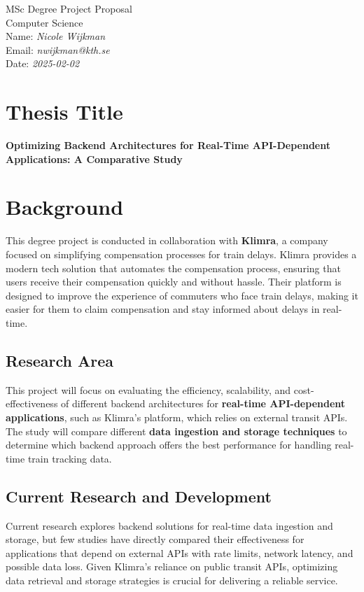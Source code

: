 \documentclass[a4paper,12pt]{article}
\begin{document}
\begin{center}
    {\Large MSc Degree Project Proposal}\\[1em]
    {\large Computer Science}\\[2em]
    Name: \textit{Nicole Wijkman} \\
    Email: \textit{nwijkman@kth.se} \\
    Date: \textit{2025-02-02}\\[2em]
\end{center}

\section{Thesis Title}
\textbf{Optimizing Backend Architectures for Real-Time API-Dependent Applications: A Comparative Study}

\section{Background}
This degree project is conducted in collaboration with \textbf{Klimra}, a company focused on simplifying compensation processes for train delays. Klimra provides a modern tech solution that automates the compensation process, ensuring that users receive their compensation quickly and without hassle. Their platform is designed to improve the experience of commuters who face train delays, making it easier for them to claim compensation and stay informed about delays in real-time.

\subsection{Research Area}
This project will focus on evaluating the efficiency, scalability, and cost-effectiveness of different backend architectures for \textbf{real-time API-dependent applications}, such as Klimra’s platform, which relies on external transit APIs. The study will compare different \textbf{data ingestion and storage techniques} to determine which backend approach offers the best performance for handling real-time train tracking data.

\subsection{Current Research and Development}
Current research explores backend solutions for real-time data ingestion and storage, but few studies have directly compared their effectiveness for applications that depend on external APIs with rate limits, network latency, and possible data loss. Given Klimra’s reliance on public transit APIs, optimizing data retrieval and storage strategies is crucial for delivering a reliable service.
\end{document}
